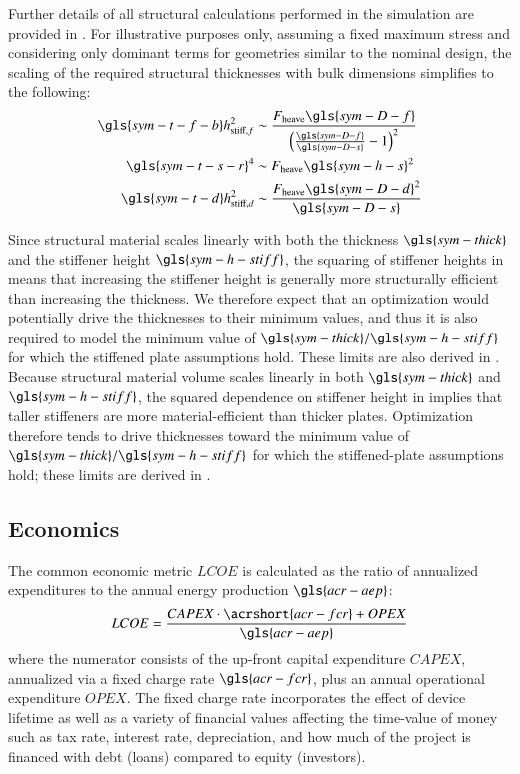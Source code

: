 Further details of all structural calculations performed in the simulation are provided in .
For illustrative purposes only, assuming a fixed maximum stress and considering only dominant terms for geometries similar to the nominal design, the scaling of the required structural thicknesses with bulk dimensions simplifies to the following:
\begin{equation}\label{eq:struct-scaling}
\begin{aligned}
    \gls{sym-t-f-b} h_{\text{stiff},f}^2 &\sim \frac{F_{\text{heave}} \gls{sym-D-f}}{\left(\frac{\gls{sym-D-f}}{\gls{sym-D-s}}-1\right)^2} \\
    \gls{sym-t-s-r}^4 &\sim F_{\text{heave}} \gls{sym-h-s}^2 \\
    \gls{sym-t-d} h_{\text{stiff},d}^2 &\sim \frac{F_{\text{heave}}\gls{sym-D-d}^2}{\gls{sym-D-s}} \\
\end{aligned}
\end{equation}

\ifdefined\DISSERTATION
    Since structural material scales linearly with both the thickness $\gls{sym-thick}$ and the stiffener height $\gls{sym-h-stiff}$, the squaring of stiffener heights in  means that increasing the stiffener height is generally more structurally efficient than increasing the thickness.
    We therefore expect that an optimization would potentially drive the thicknesses to their minimum values, and thus it is also required to model the minimum value of $\gls{sym-thick}/\gls{sym-h-stiff}$ for which the stiffened plate assumptions hold.
    These limits are also derived in .
\else
    Because structural material volume scales linearly in both $\gls{sym-thick}$ and $\gls{sym-h-stiff}$, the squared dependence on stiffener height in  implies that taller stiffeners are more material-efficient than thicker plates.
    Optimization therefore tends to drive thicknesses toward the minimum value of $\gls{sym-thick}/\gls{sym-h-stiff}$ for which the stiffened-plate assumptions hold;
    these limits are derived in .
\fi

\subsection{Economics}\label{sec:econ}
The common economic metric $LCOE$ is calculated as the ratio of annualized expenditures to the annual energy production $\gls{acr-aep}$:
\begin{equation}\label{eq:lcoe}
    LCOE = \frac{CAPEX \cdot \acrshort{acr-fcr} + OPEX}{\gls{acr-aep}}
\end{equation}
where the numerator consists of the up-front capital expenditure $CAPEX$, annualized via a fixed charge rate $\gls{acr-fcr}$, plus an annual operational expenditure $OPEX$.
\ifdefined\DISSERTATION
    The fixed charge rate incorporates the effect of device lifetime as well as a variety of financial values affecting the time-value of money such as tax rate, interest rate, depreciation, and how much of the project is financed with debt (loans) compared to equity (investors).
\fi

